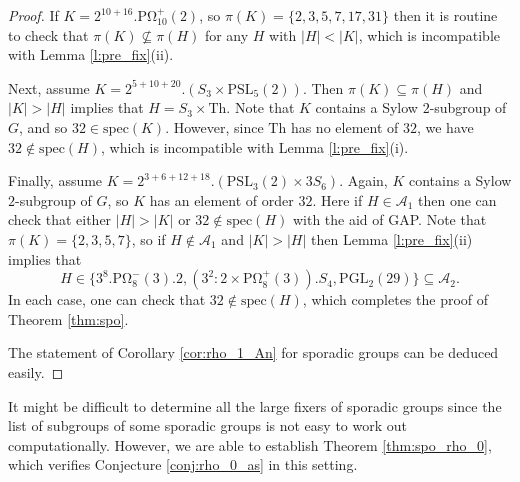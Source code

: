 \documentclass[twoside,a4paper,reqno,11pt]{amsart}
\newcommand{\<}{\langle}
\renewcommand{\>}{\rangle}
\newcommand{\PSL}{\mathrm{PSL}}
\newcommand{\PGL}{\mathrm{PGL}}
\newcommand{\POmega}{\mathrm{P\Omega}}
\newcommand{\Spec}{\mathrm{spec}}
\theoremstyle{definition}
\begin{document}
\begin{proof}
		If $K = 2^{10+16}.\POmega_{10}^+(2)$, so $\pi(K) = \{2,3,5,7,17,31\}$ then it is routine to check that $\pi(K)\not\subseteq\pi(H)$ for any $H$ with $|H| < |K|$, which is incompatible with Lemma \ref{l:pre_fix}(ii).
		
		Next, assume $K = 2^{5+10+20}.(S_3\times \PSL_5(2))$. Then $\pi(K)\subseteq\pi(H)$ and $|K| > |H|$ implies that $H = S_3\times\mathrm{Th}$. Note that $K$ contains a Sylow $2$-subgroup of $G$, and so $32\in\Spec(K)$. However, since $\mathrm{Th}$ has no element of $32$, we have $32\notin\Spec(H)$, which is incompatible with Lemma \ref{l:pre_fix}(i).
		
		Finally, assume $K = 2^{3+6+12+18}.(\PSL_3(2)\times 3S_6)$. Again, $K$ contains a Sylow $2$-subgroup of $G$, so $K$ has an element of order $32$. Here if $H\in\mathcal{A}_1$ then one can check that either $|H| > |K|$ or $32\notin\Spec(H)$ with the aid of \textsf{GAP}. Note that $\pi(K) = \{2,3,5,7\}$, so if $H\notin\mathcal{A}_1$ and $|K| > |H|$ then Lemma \ref{l:pre_fix}(ii) implies that
		\begin{equation*}
		H\in\{3^8.\POmega_8^-(3).2, (3^2{:}2\times \POmega_8^+(3)).S_4, \PGL_2(29)\}\subseteq\mathcal{A}_2.
		\end{equation*}
		In each case, one can check that $32\notin\Spec(H)$, which completes the proof of Theorem \ref{thm:spo}.
		
		The statement of Corollary \ref{cor:rho_1_An} for sporadic groups can be deduced easily.
	\end{proof}
	
	
	It might be difficult to determine all the large fixers of sporadic groups since the list of subgroups of some sporadic groups is not easy to work out computationally. However, we are able to establish Theorem \ref{thm:spo_rho_0}, which verifies Conjecture \ref{conj:rho_0_as} in this setting.
	
\end{document}
